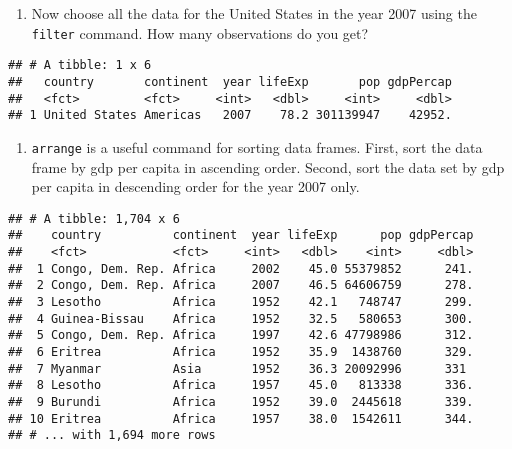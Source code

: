 \documentclass[]{article}
\newenvironment{Shaded}{\begin{snugshade}}{\end{snugshade}}
\newcommand{\KeywordTok}[1]{\textcolor[rgb]{0.13,0.29,0.53}{\textbf{#1}}}
\newcommand{\DecValTok}[1]{\textcolor[rgb]{0.00,0.00,0.81}{#1}}
\newcommand{\StringTok}[1]{\textcolor[rgb]{0.31,0.60,0.02}{#1}}
\newcommand{\OperatorTok}[1]{\textcolor[rgb]{0.81,0.36,0.00}{\textbf{#1}}}
\newcommand{\NormalTok}[1]{#1}
\providecommand{\tightlist}{%
  \setlength{\itemsep}{0pt}\setlength{\parskip}{0pt}}
\begin{document}
\begin{enumerate}
\def\labelenumi{\arabic{enumi}.}
\setcounter{enumi}{2}
\tightlist
\item
  Now choose all the data for the United States in the year 2007 using
  the \texttt{filter} command. How many observations do you get?
\end{enumerate}

\begin{Shaded}
\end{Shaded}

\begin{verbatim}
## # A tibble: 1 x 6
##   country       continent  year lifeExp       pop gdpPercap
##   <fct>         <fct>     <int>   <dbl>     <int>     <dbl>
## 1 United States Americas   2007    78.2 301139947    42952.
\end{verbatim}

\begin{enumerate}
\def\labelenumi{\arabic{enumi}.}
\setcounter{enumi}{3}
\tightlist
\item
  \texttt{arrange} is a useful command for sorting data frames. First,
  sort the data frame by gdp per capita in ascending order. Second, sort
  the data set by gdp per capita in descending order for the year 2007
  only.
\end{enumerate}

\begin{Shaded}
\end{Shaded}

\begin{verbatim}
## # A tibble: 1,704 x 6
##    country          continent  year lifeExp      pop gdpPercap
##    <fct>            <fct>     <int>   <dbl>    <int>     <dbl>
##  1 Congo, Dem. Rep. Africa     2002    45.0 55379852      241.
##  2 Congo, Dem. Rep. Africa     2007    46.5 64606759      278.
##  3 Lesotho          Africa     1952    42.1   748747      299.
##  4 Guinea-Bissau    Africa     1952    32.5   580653      300.
##  5 Congo, Dem. Rep. Africa     1997    42.6 47798986      312.
##  6 Eritrea          Africa     1952    35.9  1438760      329.
##  7 Myanmar          Asia       1952    36.3 20092996      331 
##  8 Lesotho          Africa     1957    45.0   813338      336.
##  9 Burundi          Africa     1952    39.0  2445618      339.
## 10 Eritrea          Africa     1957    38.0  1542611      344.
## # ... with 1,694 more rows
\end{verbatim}
\end{document}
